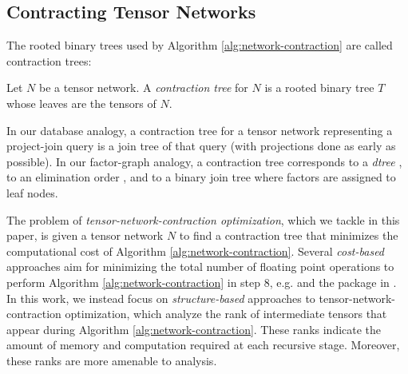\subsection{Contracting Tensor Networks}
The rooted binary trees used by Algorithm \ref{alg:network-contraction} are called contraction trees:
\begin{definition} \label{def:contraction-tree}
	Let $N$ be a tensor network. A \emph{contraction tree} for $N$ is a rooted binary tree $T$ whose leaves are the tensors of $N$. %
\end{definition}

In our database analogy, a contraction tree for a tensor network representing a project-join query is a join tree of that query (with projections done as early as possible). In our factor-graph analogy, a contraction tree corresponds to a \emph{dtree} \cite{darwiche01}, to an elimination order \cite{darwiche01b}, and to a binary join tree \cite{shenoy97} where factors are assigned to leaf nodes.

The problem of \emph{tensor-network-contraction optimization}, which we tackle in this paper, is given a tensor network $N$ to find a contraction tree that minimizes the computational cost of Algorithm \ref{alg:network-contraction}. %
Several \emph{cost-based} approaches aim for minimizing the total number of floating point operations to perform Algorithm \ref{alg:network-contraction} in step 8, e.g. \cite{PHV14} and the  package in .  %
In this work, we instead focus on \emph{structure-based} approaches to tensor-network-contraction optimization, which analyze the rank of intermediate tensors that appear during Algorithm \ref{alg:network-contraction}. These ranks indicate the amount of memory and computation required at each recursive stage. Moreover, these ranks are more amenable to analysis.

